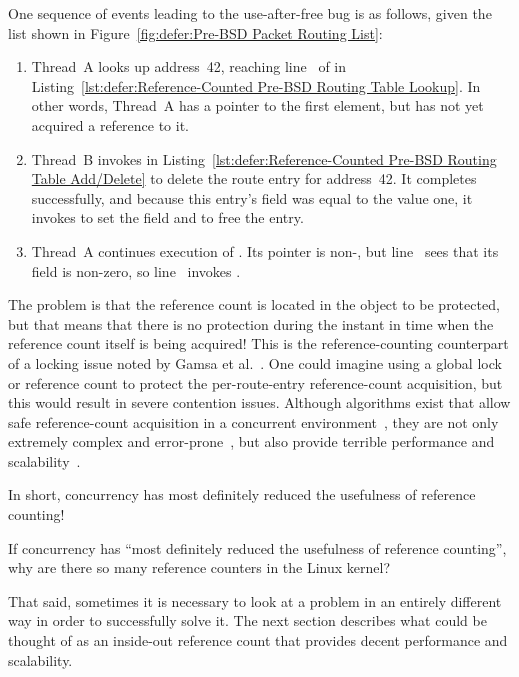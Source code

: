 One sequence of events leading to the use-after-free bug is as follows,
given the list shown in
Figure~\ref{fig:defer:Pre-BSD Packet Routing List}:

\begin{fcvref}
\begin{enumerate}
\item	Thread~A looks up address~42, reaching
	line~ of
	 in
	Listing~\ref{lst:defer:Reference-Counted Pre-BSD Routing Table Lookup}.
	In other words, Thread~A has a pointer to the first element,
	but has not yet acquired a reference to it.
\item	Thread~B invokes  in
	Listing~\ref{lst:defer:Reference-Counted Pre-BSD Routing Table Add/Delete}
	to delete the route entry for address~42.
	It completes successfully, and because this entry's 
	field was equal to the value one, it invokes
	 to set the  field and to free the entry.
\item	Thread~A continues execution of .
	Its  pointer is non-, but
	line~ sees that
	its  field is non-zero,
        so line~ invokes
	.
\end{enumerate}
\end{fcvref}

The problem is that the reference count is located in the object
to be protected, but that means that there is no protection during
the instant in time when the reference count itself is being acquired!
This is the reference-counting counterpart of a locking issue noted
by Gamsa et al.~\cite{Gamsa99}.
One could imagine using a global lock or reference count to protect
the per-route-entry reference-count acquisition, but this would
result in severe contention issues.
Although algorithms exist that allow safe reference-count acquisition
in a concurrent environment~\cite{Valois95a}, they are not only extremely
complex and error-prone~\cite{MagedMichael95a}, but also provide
terrible performance and scalability~\cite{ThomasEHart2007a}.

In short, concurrency has most definitely reduced the usefulness
of reference counting!

\QuickQuiz{}
	If concurrency has ``most definitely reduced the usefulness
	of reference counting'', why are there so many reference
	counters in the Linux kernel?
 \QuickQuizEnd

That said, sometimes it is necessary to look at a problem in an
entirely different way in order to successfully solve it.
The next section describes what could be thought of as an
inside-out reference count that provides decent performance
and scalability.
